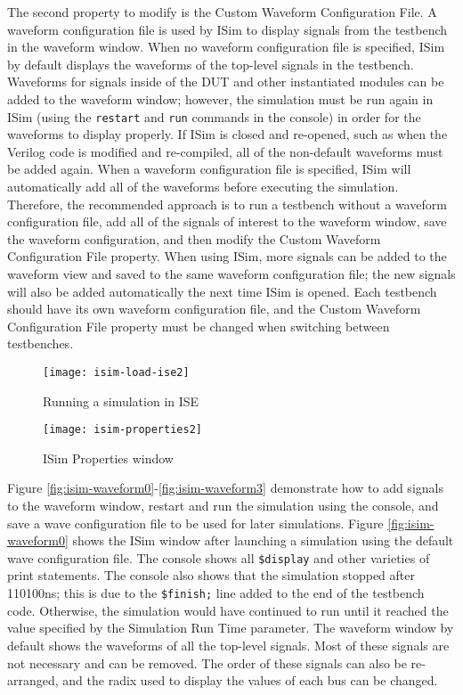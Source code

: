 The second property to modify is the Custom Waveform Configuration File. A waveform configuration file is used by ISim to display signals from the testbench in the waveform window. When no waveform configuration file is specified, ISim by default displays the waveforms of the top-level signals in the testbench. Waveforms for signals inside of the DUT and other instantiated modules can be added to the waveform window; however, the simulation must be run again in ISim (using the \texttt{restart} and \texttt{run} commands in the console) in order for the waveforms to display properly. If ISim is closed and re-opened, such as when the Verilog code is modified and re-compiled, all of the non-default waveforms must be added again. When a waveform configuration file is specified, ISim will automatically add all of the waveforms before executing the simulation. Therefore, the recommended approach is to run a testbench without a waveform configuration file, add all of the signals of interest to the waveform window, save the waveform configuration, and then modify the Custom Waveform Configuration File property. When using ISim, more signals can be added to the waveform view and saved to the same waveform configuration file; the new signals will also be added automatically the next time ISim is opened. Each testbench should have its own waveform configuration file, and the Custom Waveform Configuration File property must be changed when switching between testbenches.

\begin{figure}
\centering
\texttt{[image: isim-load-ise2]}
\caption{Running a simulation in ISE}
\label{fig:isim-load-ise2}
\end{figure}

\begin{figure}
\centering
\texttt{[image: isim-properties2]}
\caption{ISim Properties window}
\label{fig:isim-properties2}
\end{figure}

Figure \ref{fig:isim-waveform0}-\ref{fig:isim-waveform3} demonstrate how to add signals to the waveform window, restart and run the simulation using the console, and save a wave configuration file to be used for later simulations. Figure \ref{fig:isim-waveform0} shows the ISim window after launching a simulation using the default wave configuration file. The console shows all \texttt{\$display} and other varieties of print statements. The console also shows that the simulation stopped after 110100ns; this is due to the \texttt{\$finish;} line added to the end of the testbench code. Otherwise, the simulation would have continued to run until it reached the value specified by the Simulation Run Time parameter. The waveform window by default shows the waveforms of all the top-level signals. Most of these signals are not necessary and can be removed. The order of these signals can also be re-arranged, and the radix used to display the values of each bus can be changed.

